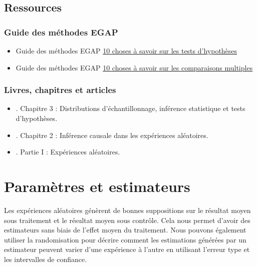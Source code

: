 \documentclass[
  12pt,
]{book}
\begin{document}
\hypertarget{ressources-3}{%
\section{Ressources}\label{ressources-3}}

\hypertarget{guide-des-muxe9thodes-egap-3}{%
\subsection{Guide des méthodes EGAP}\label{guide-des-muxe9thodes-egap-3}}

\begin{itemize}
\item
  Guide des méthodes EGAP \href{https://egap.org/resource/10-things-to-know-about-hypothesis-testing/}{10 choses à savoir sur les tests d'hypothèses}
\item
  Guide des méthodes EGAP \href{https://egap.org/resource/10-things-to-know-about-multiple-comparisons/}{10 choses à savoir sur les comparaisons multiples}
\end{itemize}

\hypertarget{livres-chapitres-et-articles-2}{%
\subsection{Livres, chapitres et articles}\label{livres-chapitres-et-articles-2}}

\begin{itemize}
\item
  \autocite{gerber_field_2012}. Chapitre 3 : Distributions d'échantillonnage, inférence statistique et tests d'hypothèses.
\item
  \autocite{rosenbaum2010design}. Chapitre 2 : Inférence causale dans les expériences aléatoires.
\item
  \autocite{rosenbaum2017observation}. Partie I : Expériences aléatoires.
\end{itemize}

\hypertarget{paramuxe8tres-et-estimateurs}{%
\chapter{Paramètres et estimateurs}\label{paramuxe8tres-et-estimateurs}}

Les expériences aléatoires génèrent de bonnes suppositions sur le résultat moyen sous traitement et le résultat moyen sous contrôle. Cela nous permet d'avoir des estimateurs sans biais de l'effet moyen du traitement. Nous pouvons également utiliser la randomisation pour décrire comment les estimations générées par un estimateur peuvent varier d'une expérience à l'autre en utilisant l'erreur type et les intervalles de confiance.
\end{document}
